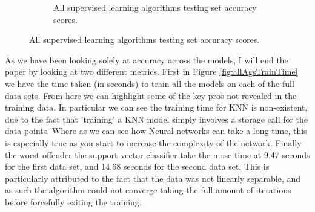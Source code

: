 \documentclass[
	letterpaper, %
]{IEEEtran}
\begin{document}
\begin{figure}[h]
\begin{subfigure}{.5\textwidth}
			\caption{All supervised learning algorithms testing set accuracy scores.}
			\label{fig:allAgsTestAcc}
		\end{subfigure}
	\end{figure}

	As we have been looking solely at accuracy across the models, I will end the paper by looking at two different metrics. First in Figure \ref{fig:allAgsTrainTime} we have the time taken (in seconds) to train all the models on each of the full data sets. From here we can highlight some of the key pros not revealed in the training data. In particular we can see the training time for KNN is non-existent, due to the fact that 'training' a KNN model simply involves a storage call for the data points. Where as we can see how Neural networks can take a long time, this is especially true as you start to increase the complexity of the network. Finally the worst offender the support vector classifier take the mose time at 9.47 seconds for the first data set, and 14.68 seconds for the second data set. This is particularly attributed to the fact that the data was not linearly separable, and as such the algorithm could not converge taking the full amount of iterations before forcefully exiting the training.
	
\end{document}
